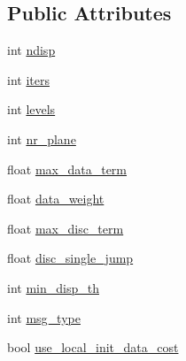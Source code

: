 \subsection*{Public Attributes}
\begin{DoxyCompactItemize}
\item 
int \hyperlink{classcv_1_1ocl_1_1StereoConstantSpaceBP_aa03a1a80256f5a32e8ee084ab7c09e70}{ndisp}
\item 
int \hyperlink{classcv_1_1ocl_1_1StereoConstantSpaceBP_ae5d0bd571e6c37c2474f74d1c7578a26}{iters}
\item 
int \hyperlink{classcv_1_1ocl_1_1StereoConstantSpaceBP_a73b35f984b49c6363264c3bb6b76f6ec}{levels}
\item 
int \hyperlink{classcv_1_1ocl_1_1StereoConstantSpaceBP_af2c44af99c4a26c501a719567debef2f}{nr\-\_\-plane}
\item 
float \hyperlink{classcv_1_1ocl_1_1StereoConstantSpaceBP_ad992c7a9a7a12c74d987e54242a9764b}{max\-\_\-data\-\_\-term}
\item 
float \hyperlink{classcv_1_1ocl_1_1StereoConstantSpaceBP_ae0b8dade37e4dd8b6330df545757509e}{data\-\_\-weight}
\item 
float \hyperlink{classcv_1_1ocl_1_1StereoConstantSpaceBP_adeb47472466181aeb384abc3a202fade}{max\-\_\-disc\-\_\-term}
\item 
float \hyperlink{classcv_1_1ocl_1_1StereoConstantSpaceBP_ad32674130e3211b42c476c4d32793657}{disc\-\_\-single\-\_\-jump}
\item 
int \hyperlink{classcv_1_1ocl_1_1StereoConstantSpaceBP_a9c729fa3727c554e06e621cf814bccb0}{min\-\_\-disp\-\_\-th}
\item 
int \hyperlink{classcv_1_1ocl_1_1StereoConstantSpaceBP_a04230baabb4a2d1485969e0feb11486d}{msg\-\_\-type}
\item 
bool \hyperlink{classcv_1_1ocl_1_1StereoConstantSpaceBP_a8185675416c0e703add4addffb0a7bd7}{use\-\_\-local\-\_\-init\-\_\-data\-\_\-cost}
\end{DoxyCompactItemize}


